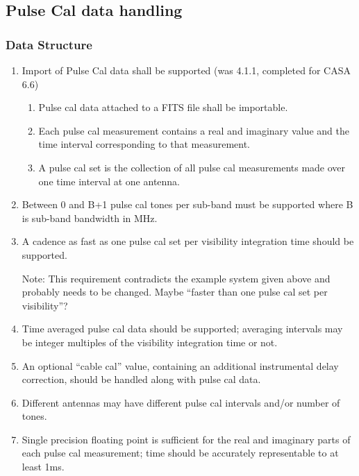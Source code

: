 \documentclass[11pt,a4paper]{article}
\begin{document}
\subsection{Pulse Cal data handling}

\subsubsection{Data Structure}

\begin{enumerate}[subsubseclist]

\item Import of Pulse Cal data shall be supported (was 4.1.1,
  completed for CASA 6.6)

\begin{enumerate}[subsubsecsublist]

\item Pulse cal data attached to a FITS file shall be importable.

\item Each pulse cal measurement contains a real and imaginary value
  and the time interval corresponding to that measurement.

\item A pulse cal set is the collection of all pulse cal measurements
  made over one time interval at one antenna.

\end{enumerate}

\item Between 0 and B+1 pulse cal tones per sub-band must be supported
  where B is sub-band bandwidth in MHz.

\item A cadence as fast as one pulse cal set per visibility
  integration time should be supported.

  Note: This requirement contradicts the example system given above
  and probably needs to be changed.  Maybe ``faster than one pulse cal
  set per visibility''?

\item Time averaged pulse cal data should be supported; averaging
  intervals may be integer multiples of the visibility integration
  time or not.

\item An optional ``cable cal'' value, containing an additional
  instrumental delay correction, should be handled along with pulse
  cal data.

\item Different antennas may have different pulse cal intervals and/or
  number of tones.

\item Single precision floating point is sufficient for the real and
  imaginary parts of each pulse cal measurement; time should be
  accurately representable to at least 1ms.

\end{enumerate}
\end{document}
